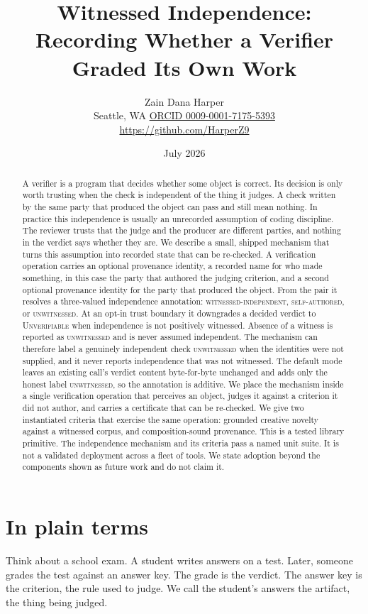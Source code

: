 \documentclass[11pt]{article}
\title{\textbf{Witnessed Independence: Recording Whether a Verifier Graded Its Own Work}}
\author{Zain Dana Harper\\[2pt]\small Seattle, WA \quad\textbar\quad \href{https://orcid.org/0009-0001-7175-5393}{ORCID 0009-0001-7175-5393}\\[2pt]\small\url{https://github.com/HarperZ9}}
\date{July 2026}
\begin{document}
\maketitle
\begin{abstract}
A verifier is a program that decides whether some object is correct. Its decision is only worth trusting when the check is independent of the thing it judges. A check written by the same party that produced the object can pass and still mean nothing. In practice this independence is usually an unrecorded assumption of coding discipline. The reviewer trusts that the judge and the producer are different parties, and nothing in the verdict says whether they are. We describe a small, shipped mechanism that turns this assumption into recorded state that can be re-checked. A verification operation carries an optional provenance identity, a recorded name for who made something, in this case the party that authored the judging criterion, and a second optional provenance identity for the party that produced the object. From the pair it resolves a three-valued independence annotation: \textsc{witnessed-independent}, \textsc{self-authored}, or \textsc{unwitnessed}. At an opt-in trust boundary it downgrades a decided verdict to \textsc{Unverifiable} when independence is not positively witnessed. Absence of a witness is reported as \textsc{unwitnessed} and is never assumed independent. The mechanism can therefore label a genuinely independent check \textsc{unwitnessed} when the identities were not supplied, and it never reports independence that was not witnessed. The default mode leaves an existing call's verdict content byte-for-byte unchanged and adds only the honest label \textsc{unwitnessed}, so the annotation is additive. We place the mechanism inside a single verification operation that perceives an object, judges it against a criterion it did not author, and carries a certificate that can be re-checked. We give two instantiated criteria that exercise the same operation: grounded creative novelty against a witnessed corpus, and composition-sound provenance. This is a tested library primitive. The independence mechanism and its criteria pass a named unit suite. It is not a validated deployment across a fleet of tools. We state adoption beyond the components shown as future work and do not claim it.
\end{abstract}

\section*{In plain terms}
Think about a school exam. A student writes answers on a test. Later, someone grades the test against an answer key. The grade is the verdict. The answer key is the criterion, the rule used to judge. We call the student's answers the artifact, the thing being judged.
\end{document}
